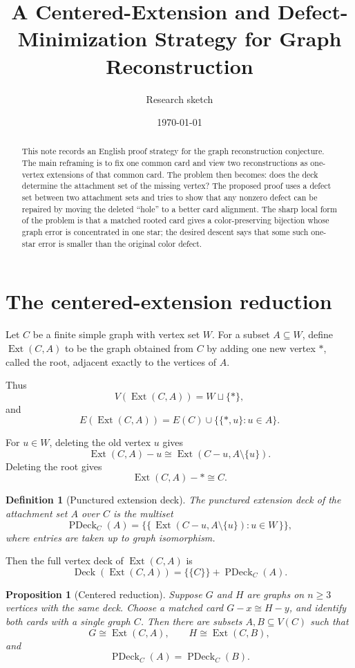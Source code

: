 \documentclass[11pt]{article}
\title{A Centered-Extension and Defect-Minimization Strategy for Graph Reconstruction}
\author{Research sketch}
\date{\today}
\newtheorem{proposition}{Proposition}
\newtheorem{definition}{Definition}
\newcommand{\Deck}{\operatorname{Deck}}
\newcommand{\PDeck}{\operatorname{PDeck}}
\newcommand{\Ext}{\operatorname{Ext}}
\begin{document}
\maketitle

\begin{abstract}
This note records an English proof strategy for the graph reconstruction
conjecture.  The main reframing is to fix one common card and view two
reconstructions as one-vertex extensions of that common card.  The problem
then becomes: does the deck determine the attachment set of the missing
vertex?  The proposed proof uses a defect set between two attachment sets and
tries to show that any nonzero defect can be repaired by moving the deleted
``hole'' to a better card alignment.  The sharp local form of the problem is
that a matched rooted card gives a color-preserving bijection whose graph
error is concentrated in one star; the desired descent says that some such
one-star error is smaller than the original color defect.
\end{abstract}

\section{The centered-extension reduction}

Let \(C\) be a finite simple graph with vertex set \(W\).  For a subset
\(A \subseteq W\), define \(\Ext(C,A)\) to be the graph obtained from \(C\)
by adding one new vertex \(\ast\), called the root, adjacent exactly to the
vertices of \(A\).

Thus
\[
  V(\Ext(C,A)) = W \sqcup \{\ast\},
\]
and
\[
  E(\Ext(C,A)) =
    E(C) \cup \{\{\ast,u\} : u \in A\}.
\]

For \(u \in W\), deleting the old vertex \(u\) gives
\[
  \Ext(C,A)-u \cong \Ext(C-u, A \setminus \{u\}).
\]
Deleting the root gives
\[
  \Ext(C,A)-\ast \cong C.
\]

\begin{definition}[Punctured extension deck]
The punctured extension deck of the attachment set \(A\) over \(C\) is the
multiset
\[
  \PDeck_C(A)
  =
  \{\!\{\, \Ext(C-u, A\setminus\{u\}) : u \in W \,\}\!\},
\]
where entries are taken up to graph isomorphism.
\end{definition}

Then the full vertex deck of \(\Ext(C,A)\) is
\[
  \Deck(\Ext(C,A)) = \{\!\{ C \}\!\} + \PDeck_C(A).
\]

\begin{proposition}[Centered reduction]
Suppose \(G\) and \(H\) are graphs on \(n \geq 3\) vertices with the same
deck.  Choose a matched card \(G-x \cong H-y\), and identify both cards with a
single graph \(C\).  Then there are subsets \(A,B \subseteq V(C)\) such that
\[
  G \cong \Ext(C,A),
  \qquad
  H \cong \Ext(C,B),
\]
and
\[
  \PDeck_C(A) = \PDeck_C(B).
\]
\end{proposition}
\end{document}
